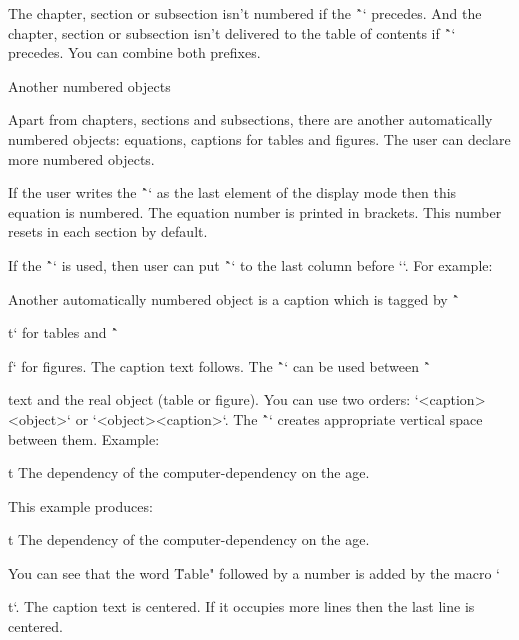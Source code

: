 The chapter, section or subsection isn't numbered if the \^`\nonum` precedes.
And the chapter, section or subsection isn't delivered to the table of
contents if \^`\notoc` precedes. You can combine both prefixes.

\secc[cap] Another numbered objects

Apart from chapters, sections and subsections, there are another
automatically numbered objects: equations, captions for tables and
figures. The user can declare more numbered objects.

If the user writes the \^`\eqmark` as the last element of the display mode then
this equation is numbered. The equation number is printed in brackets. This number
resets in each section by default.

If the \^`\eqalignno` is used, then user can put \^`\eqmark` to the last column
before `\cr`. For example:

\begtt
{}
\endtt

Another automatically numbered object is a caption which is tagged by \^`\caption/t` for
tables and \^`\caption/f` for figures. The caption text follows.
The \^`\cskip` can be used between \^`\caption` text and the real object (table
or figure). You can use two orders: `<caption>\cskip <object>` or 
`<object>\cskip <caption>`.
The \^`\cskip` creates appropriate vertical space between them. Example:

\begtt
\caption/t The dependency of the computer-dependency on the age.
\cskip
\noindent\hfil{}
\endtt

This example produces:

\medskip
\caption/t The dependency of the computer-dependency on the age.
\cskip
\noindent\hfil{}
\medskip

You can see that the word \"Table" followed by a number is added by the macro 
`\caption/t`. 
The caption text is centered. If it occupies more lines then the 
last line is centered.

